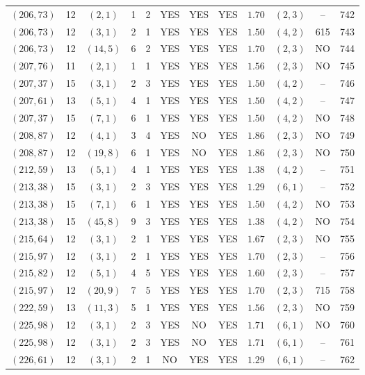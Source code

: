 \begin{longtable}{|c|c|c|c|c|c|c|c|c|c|c|c|}
$(206,73)$ & 12 & $(2,1)$ & 1 & 2 & YES & YES & YES & $1.70$ & $(2,3)$ & -- & 742\\
$(206,73)$ & 12 & $(3,1)$ & 2 & 1 & YES & YES & YES & $1.50$ & $(4,2)$ & 615 & 743\\
$(206,73)$ & 12 & $(14,5)$ & 6 & 2 & YES & YES & YES & $1.70$ & $(2,3)$ & NO & 744\\
$(207,76)$ & 11 & $(2,1)$ & 1 & 1 & YES & YES & YES & $1.56$ & $(2,3)$ & NO & 745\\
$(207,37)$ & 15 & $(3,1)$ & 2 & 3 & YES & YES & YES & $1.50$ & $(4,2)$ & -- & 746\\
$(207,61)$ & 13 & $(5,1)$ & 4 & 1 & YES & YES & YES & $1.50$ & $(4,2)$ & -- & 747\\
$(207,37)$ & 15 & $(7,1)$ & 6 & 1 & YES & YES & YES & $1.50$ & $(4,2)$ & NO & 748\\
$(208,87)$ & 12 & $(4,1)$ & 3 & 4 & YES & NO & YES & $1.86$ & $(2,3)$ & NO & 749\\
$(208,87)$ & 12 & $(19,8)$ & 6 & 1 & YES & NO & YES & $1.86$ & $(2,3)$ & NO & 750\\
$(212,59)$ & 13 & $(5,1)$ & 4 & 1 & YES & YES & YES & $1.38$ & $(4,2)$ & -- & 751\\
$(213,38)$ & 15 & $(3,1)$ & 2 & 3 & YES & YES & YES & $1.29$ & $(6,1)$ & -- & 752\\
$(213,38)$ & 15 & $(7,1)$ & 6 & 1 & YES & YES & YES & $1.50$ & $(4,2)$ & NO & 753\\
$(213,38)$ & 15 & $(45,8)$ & 9 & 3 & YES & YES & YES & $1.38$ & $(4,2)$ & NO & 754\\
$(215,64)$ & 12 & $(3,1)$ & 2 & 1 & YES & YES & YES & $1.67$ & $(2,3)$ & NO & 755\\
$(215,97)$ & 12 & $(3,1)$ & 2 & 1 & YES & YES & YES & $1.70$ & $(2,3)$ & -- & 756\\
$(215,82)$ & 12 & $(5,1)$ & 4 & 5 & YES & YES & YES & $1.60$ & $(2,3)$ & -- & 757\\
$(215,97)$ & 12 & $(20,9)$ & 7 & 5 & YES & YES & YES & $1.70$ & $(2,3)$ & 715 & 758\\
$(222,59)$ & 13 & $(11,3)$ & 5 & 1 & YES & YES & YES & $1.56$ & $(2,3)$ & NO & 759\\
$(225,98)$ & 12 & $(3,1)$ & 2 & 3 & YES & NO & YES & $1.71$ & $(6,1)$ & NO & 760\\
$(225,98)$ & 12 & $(3,1)$ & 2 & 3 & YES & NO & YES & $1.71$ & $(6,1)$ & -- & 761\\
$(226,61)$ & 12 & $(3,1)$ & 2 & 1 & NO & YES & YES & $1.29$ & $(6,1)$ & -- & 762\\

\end{longtable}
